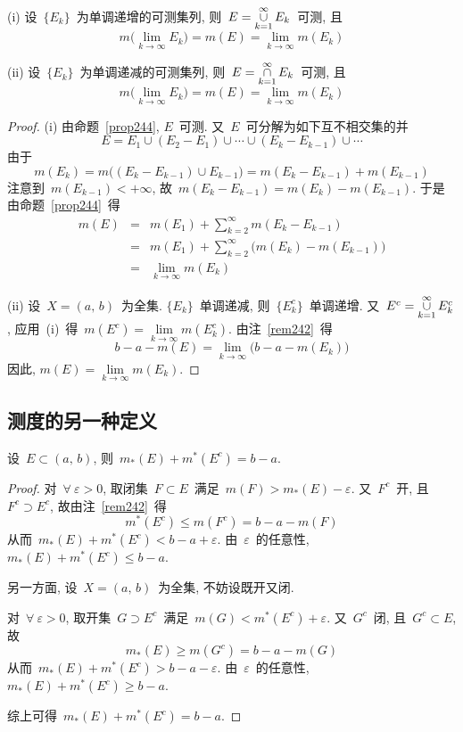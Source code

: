 \begin{proposition} \label{prop245}

(i) 设~$\{E_k\}$~为单调递增的可测集列, 则~$E =\mathop{\cup}\limits_{k=1}^\infty E_k$~可测, 且
\[
m\big( \lim_{k \to \infty} E_k \big) = m(E) = \lim_{k \to \infty} m(E_k)
\]

(ii) 设~$\{E_k\}$~为单调递减的可测集列, 则~$E = \mathop{\cap}\limits_{k=1}^\infty E_k$~可测, 且
\[
m\big( \lim_{k \to \infty} E_k \big) = m(E) = \lim_{k \to \infty} m(E_k)
\]
\end{proposition}

\begin{proof}
(i) 由命题~\ref{prop244}, $E$~可测. 又~$E$~可分解为如下互不相交集的并
\[
E = E_1 \cup (E_2 - E_1) \cup \cdots \cup (E_k - E_{k-1}) \cup \cdots
\]
由于
\[
m(E_k) = m\big((E_k - E_{k-1}) \cup E_{k-1}\big) = m(E_k - E_{k-1}) + m(E_{k-1})
\]
注意到~$m(E_{k-1}) < +\infty$, 故~$m(E_k - E_{k-1}) = m(E_k) - m(E_{k-1})$.
于是由命题~\ref{prop244}~得
\begin{eqnarray*}
m(E) &=& m(E_1) + \sum_{k=2}^\infty m(E_k - E_{k-1}) \\
&=& m(E_1) + \sum_{k=2}^\infty \big(m(E_k) - m(E_{k-1})\big) \\
&=& \lim_{k \to \infty} m(E_k)
\end{eqnarray*}

(ii) 设~$X = (a,\,b)$~为全集. $\{E_k\}$~单调递减, 则~$\{E_k^c\}$~单调递增.
又~$E^c = \mathop{\cup}\limits_{k=1}^\infty E_k^c$, 应用~(i)~得~$m(E^c) =
\lim\limits_{k \to \infty} m(E_k^c)$. 由注~\ref{rem242}~得
\[
b-a - m(E) = \lim\limits_{k \to \infty} \big( b-a - m(E_k) \big)
\]
因此, $m(E) = \lim\limits_{k \to \infty} m(E_k)$.
\end{proof}

\subsection{测度的另一种定义}

\begin{lemma} \label{lem241}
设~$E \subset (a,\,b)$, 则~$m_*(E) + m^*(E^c) = b-a$.
\end{lemma}

\begin{proof}
对~$\forall~\varepsilon > 0$, 取闭集~$F \subset E$~满足~$m(F) > m_*(E) - \varepsilon$.
又~$F^c$~开, 且~$F^c \supset E^c$, 故由注~\ref{rem242}~得
\[
m^*(E^c) \leqslant m(F^c) = b-a - m(F)
\]
从而~$m_*(E) + m^*(E^c) < b-a + \varepsilon$. 由~$\varepsilon$~的任意性,
$m_*(E) + m^*(E^c) \leqslant b-a$.

另一方面, 设~$X = (a,\,b)$~为全集, 不妨设既开又闭. 

对~$\forall~\varepsilon > 0$, 取开集~$G \supset E^c$~满足~$m(G) < m^*(E^c) + \varepsilon$. 
又~$G^c$~闭, 且~$G^c \subset E$, 故
\[
m_*(E) \geqslant m(G^c) = b-a - m(G)
\]
从而~$m_*(E) + m^*(E^c) > b-a - \varepsilon$. 由~$\varepsilon$~的任意性,
$m_*(E) + m^*(E^c) \geqslant b-a$.

综上可得~$m_*(E) + m^*(E^c) = b-a$.
\end{proof}

